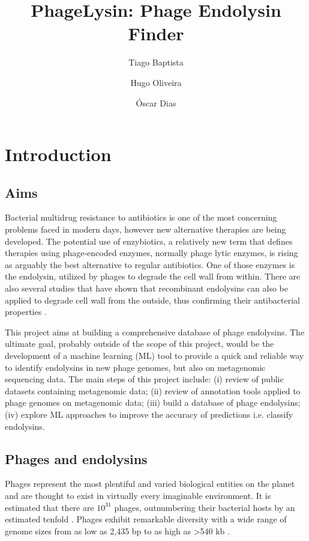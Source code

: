\documentclass[runningheads]{llncs}
\begin{document}
\title{PhageLysin: Phage Endolysin Finder}
%
\author{Tiago Baptista \and
Hugo Oliveira \and
Óscar Dias}
%
%
\maketitle
%
%
\section{Introduction}
%
\subsection{Aims}
Bacterial multidrug resistance to antibiotics is one of the most concerning problems faced in modern days, however new alternative therapies are being developed. The potential use of enzybiotics, a relatively new term that defines therapies using phage-encoded enzymes, normally phage lytic enzymes, is rising as arguably the best alternative to regular antibiotics. One of those enzymes is the endolysin, utilized by phages to degrade the cell wall from within. There are also several studies that have shown that recombinant endolysins can also be applied to degrade cell wall from the outside, thus confirming their antibacterial properties \cite{Abdelrahman2021} \cite{Briers2019}.

This project aims at building a comprehensive database of phage endolysins. The ultimate goal, probably outside of the scope of this project, would be the development of a machine learning (ML) tool to provide a quick and reliable way to identify endolysins in new phage genomes, but also on metagenomic sequencing data.
The main steps of this project include: (i) review of public datasets containing metagenomic data; (ii) review of annotation tools applied to phage genomes on metagenomic data; (iii) build a database of phage endolysins; (iv) explore ML approaches to improve the accuracy of predictions i.e. classify endolysins.
%
\subsection{Phages and endolysins}
Phages represent the most plentiful and varied biological entities on the planet and are thought to exist in virtually every imaginable environment. It is estimated that there are \(10^{31}\) phages, outnumbering their bacterial hosts by an estimated tenfold \cite{Dion2020} \cite{Oliveira2013} \cite{Sharma2017}. Phages exhibit remarkable diversity with a wide range of genome sizes from as low as 2,435 bp to as high as >540 kb \cite{Dion2020}.
\end{document}
